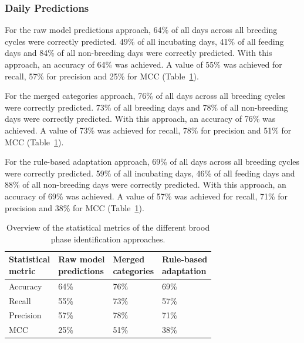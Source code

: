 \subsubsection{Daily Predictions}
For the raw model predictions approach, 64\% of all days across all breeding cycles were correctly predicted. 49\% of all incubating days, 41\% of all feeding days and 84\% of all non-breeding days were correctly predicted. With this approach, an accuracy of 64\% was achieved. A value of 55\% was achieved for recall, 57\% for precision and 25\% for MCC (Table~\ref{table:stats_breeding_model}).

For the merged categories approach, 76\% of all days across all breeding cycles were correctly predicted. 73\% of all breeding days and 78\% of all non-breeding days were correctly predicted. With this approach, an accuracy of 76\% was achieved. A value of 73\% was achieved for recall, 78\% for precision and 51\% for MCC (Table~\ref{table:stats_breeding_model}).

For the rule-based adaptation approach, 69\% of all days across all breeding cycles were correctly predicted. 59\% of all incubating days, 46\% of all feeding days and 88\% of all non-breeding days were correctly predicted. With this approach, an accuracy of 69\% was achieved. A value of 57\% was achieved for recall, 71\% for precision and 38\% for MCC (Table~\ref{table:stats_breeding_model}).


\begin{table}[H]
\begin{center}
\caption[Statistical metrics of the different brood phase identification approaches]{Overview of the statistical metrics of the different brood phase identification approaches.}
\label{table:stats_breeding_model}
\begin{tabular}{| p{3cm} | p{3cm} | p{3cm} | p{3cm} | } 
\cline{1-4}
\textbf{Statistical \newline metric} & \textbf{Raw model \newline predictions} & \textbf{Merged \newline categories} & \textbf{Rule-based \newline adaptation} \\
\hline
Accuracy & 64\% & 76\% & 69\% \\ 
\hline
Recall & 55\% & 73\% & 57\% \\
\hline
Precision & 57\% & 78\% & 71\% \\
\hline
MCC & 25\% & 51\% & 38\% \\
\hline
\end{tabular}
\end{center}
\end{table}



